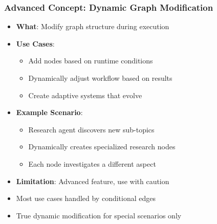 \begin{frame}[fragile]\frametitle{Advanced Concept: Dynamic Graph Modification}
      \begin{itemize}
        \item \textbf{What}: Modify graph structure during execution
        \item \textbf{Use Cases}:
        \begin{itemize}
            \item Add nodes based on runtime conditions
            \item Dynamically adjust workflow based on results
            \item Create adaptive systems that evolve
        \end{itemize}
        \item \textbf{Example Scenario}:
        \begin{itemize}
            \item Research agent discovers new sub-topics
            \item Dynamically creates specialized research nodes
            \item Each node investigates a different aspect
        \end{itemize}
        \item \textbf{Limitation}: Advanced feature, use with caution
        \item Most use cases handled by conditional edges
        \item True dynamic modification for special scenarios only
      \end{itemize}
\end{frame}

